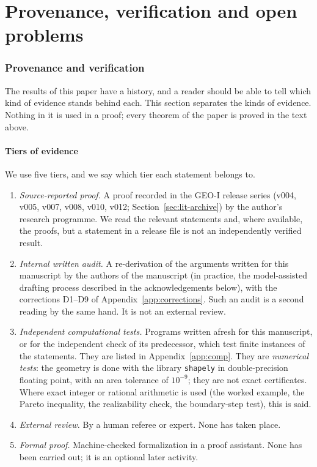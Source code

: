 \part{Provenance, verification and open problems}

\section{Provenance and verification}\label{sec:provenance}

The results of this paper have a history, and a reader should be able to tell which kind of evidence stands behind each. This section separates the kinds of evidence. Nothing in it is used in a proof; every theorem of the paper is proved in the text above.

\subsection{Tiers of evidence}\label{sec:tiers}

We use five tiers, and we say which tier each statement belongs to.

\begin{enumerate}[label=\textbf{T\arabic*.},leftmargin=*]
\item \emph{Source-reported proof.} A proof recorded in the GEO-I release series (v004, v005, v007, v008, v010, v012; Section~\ref{sec:lit-archive}) by the author's research programme. We read the relevant statements and, where available, the proofs, but a statement in a release file is not an independently verified result.
\item \emph{Internal written audit.} A re-derivation of the arguments written for this manuscript by the authors of the manuscript (in practice, the model-assisted drafting process described in the acknowledgements below), with the corrections D1--D9 of Appendix~\ref{app:corrections}. Such an audit is a second reading by the same hand. It is not an external review.
\item \emph{Independent computational tests.} Programs written afresh for this manuscript, or for the independent check of its predecessor, which test finite instances of the statements. They are listed in Appendix~\ref{app:comp}. They are \emph{numerical tests}: the geometry is done with the library \texttt{shapely} in double-precision floating point, with an area tolerance of $10^{-9}$; they are not exact certificates. Where exact integer or rational arithmetic is used (the worked example, the Pareto inequality, the realizability check, the boundary-step test), this is said.
\item \emph{External review.} By a human referee or expert. None has taken place.
\item \emph{Formal proof.} Machine-checked formalization in a proof assistant. None has been carried out; it is an optional later activity.
\end{enumerate}

